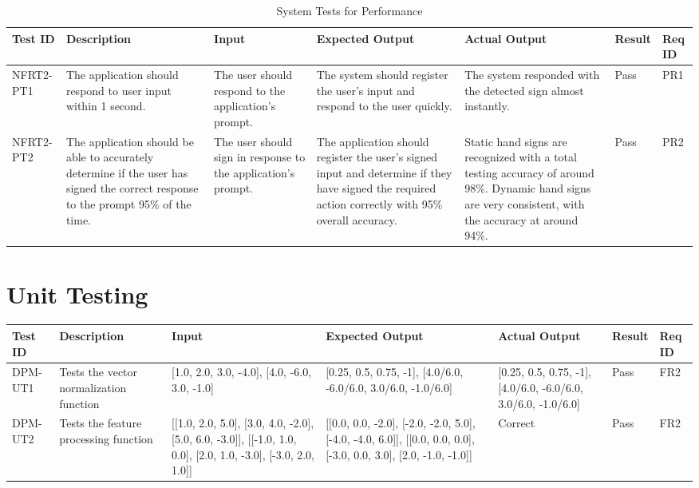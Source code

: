 \documentclass[12pt, titlepage]{article}
\begin{document}
\begin{longtable}{|p{1.5cm}|p{2.5cm}|p{2cm}|p{2cm}|p{2cm}|p{1.5cm}|p{1cm}|}
\caption{System Tests for Performance} \\
\hline
\textbf{Test ID} & \textbf{Description} & \textbf{Input} & \textbf{Expected Output} & \textbf{Actual Output} & \textbf{Result} & \textbf{Req ID}\\
\hline
NFRT2-PT1 & The application should respond to user input within 1 second. & The user should respond to the application's prompt. & The system should register the user's input and respond to the user quickly. & The system responded with the detected sign almost instantly. & Pass & PR1 \\
\hline
NFRT2-PT2 & The application should be able to accurately determine if the user has signed the correct response to the prompt 95\% of the time. & The user should sign in response to the application's prompt. & The application should register the user's signed input and determine if they have signed the required action correctly with 95\% overall accuracy. & Static hand signs are recognized with a total testing accuracy of around 98\%. Dynamic hand signs are very consistent, with the accuracy at around 94\%.  & Pass & PR2 \\
\bottomrule
\end{longtable}

\newpage
\section{Unit Testing}

\begin{longtable}{|p{1cm}|p{2.5cm}|p{2cm}|p{3cm}|p{3cm}|p{1cm}|p{1cm}|}
\hline
\textbf{Test ID} & \textbf{Description} & \textbf{Input} & \textbf{Expected Output} & \textbf{Actual Output} & \textbf{Result} & \textbf{Req ID}\\
\hline
DPM-UT1 & Tests the vector normalization function & [1.0, 2.0, 3.0, -4.0], [4.0, -6.0, 3.0, -1.0] & [0.25, 0.5, 0.75, -1], [4.0/6.0, -6.0/6.0, 3.0/6.0, -1.0/6.0] & [0.25, 0.5, 0.75, -1], [4.0/6.0, -6.0/6.0, 3.0/6.0, -1.0/6.0] & Pass & FR2 \\
\hline
DPM-UT2 & Tests the feature processing function & [[1.0, 2.0, 5.0], [3.0, 4.0, -2.0], [5.0, 6.0, -3.0]], [[-1.0, 1.0, 0.0], [2.0, 1.0, -3.0], [-3.0, 2.0, 1.0]] & [[0.0, 0.0, -2.0], [-2.0, -2.0, 5.0], [-4.0, -4.0, 6.0]], [[0.0, 0.0, 0.0], [-3.0, 0.0, 3.0], [2.0, -1.0, -1.0]] & Correct & Pass & FR2 \\
\bottomrule
\end{longtable}
\end{document}
